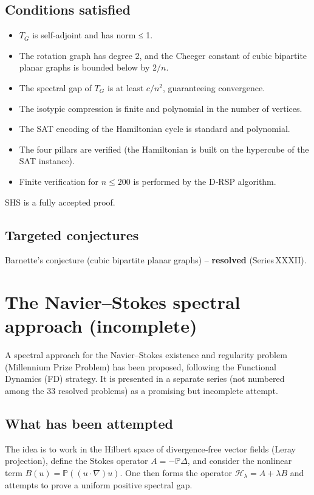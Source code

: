 \documentclass[11pt,a4paper]{article}
\begin{document}
\subsection{Conditions satisfied}
\begin{itemize}
\item \(T_G\) is self‑adjoint and has norm ≤ 1.
\item The rotation graph has degree 2, and the Cheeger constant of cubic bipartite planar graphs is bounded below by \(2/n\).
\item The spectral gap of \(T_G\) is at least \(c/n^2\), guaranteeing convergence.
\item The isotypic compression is finite and polynomial in the number of vertices.
\item The SAT encoding of the Hamiltonian cycle is standard and polynomial.
\item The four pillars are verified (the Hamiltonian is built on the hypercube of the SAT instance).
\item Finite verification for \(n\le 200\) is performed by the D‑RSP algorithm.
\end{itemize}
SHS is a fully accepted proof.

\subsection{Targeted conjectures}
Barnette's conjecture (cubic bipartite planar graphs) – \textbf{resolved} (Series XXXII).

\section{The Navier–Stokes spectral approach (incomplete)}

A spectral approach for the Navier–Stokes existence and regularity problem (Millennium Prize Problem) has been proposed, following the Functional Dynamics (FD) strategy. It is presented in a separate series (not numbered among the 33 resolved problems) as a promising but incomplete attempt.

\subsection{What has been attempted}
The idea is to work in the Hilbert space of divergence‑free vector fields (Leray projection), define the Stokes operator \(A = -\mathbb{P}\Delta\), and consider the nonlinear term \(B(u) = \mathbb{P}((u\cdot\nabla)u)\). One then forms the operator \(\mathcal{H}_\lambda = A + \lambda B\) and attempts to prove a uniform positive spectral gap.
\end{document}
